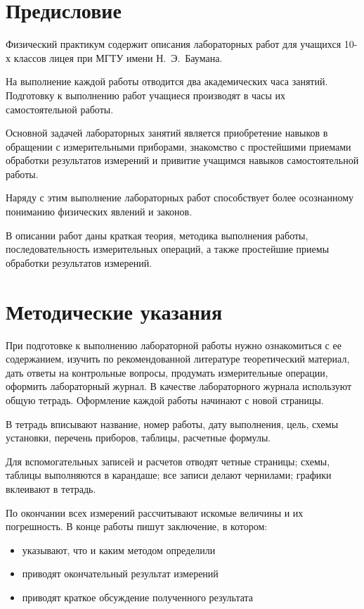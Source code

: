 \documentclass[a4paper, 12pt]{extarticle}
\begin{document}
\MTDTitlePage
\MTDInfoPage


\section*{Предисловие}
Физический практикум содержит описания лабораторных работ для учащихся 10-х классов лицея  при МГТУ имени Н.~Э.~Баумана.

На выполнение каждой работы отводится два академических часа занятий. Подготовку к выполнению работ учащиеся производят в часы их самостоятельной работы.

Основной задачей лабораторных занятий является приобретение навыков в обращении с измерительными приборами, знакомство с простейшими приемами обработки результатов измерений и привитие учащимся навыков самостоятельной работы.

Наряду с этим выполнение лабораторных работ способствует более осознанному пониманию физических явлений и законов.

В описании работ даны краткая теория, методика выполнения работы, последовательность измерительных операций, а также простейшие приемы обработки результатов измерений.

\section*{Методические указания}
При подготовке к выполнению лабораторной работы нужно ознакомиться с ее содержанием, изучить по рекомендованной литературе теоретический материал, дать ответы на контрольные вопросы, продумать измерительные операции, оформить лабораторный журнал. В качестве лабораторного журнала используют общую тетрадь. Оформление каждой работы начинают с новой страницы.

В тетрадь вписывают название, номер работы, дату выполнения, цель, схемы установки, перечень приборов, таблицы, расчетные формулы.

Для вспомогательных записей и расчетов отводят четные страницы; схемы, таблицы выполняются в карандаше; все записи делают чернилами; графики вклеивают в тетрадь.

По окончании всех измерений рассчитывают искомые величины и их погрешность. В конце работы пишут заключение, в котором:
\begin{itemize}
  \item указывают, что и каким методом определили
  \item приводят окончательный результат измерений
  \item приводят краткое обсуждение полученного результата
\end{itemize}
\end{document}
